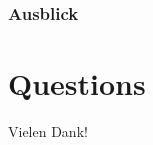 \documentclass[
	10pt,
	t		%
]{beamer}
\begin{document}
\begin{frame}
\frametitle{Ausblick}

\end{frame}

\section{Questions}
\begin{frame}[plain, c]
\begin{center}
\Large Vielen Dank!
\end{center}
\end{frame}
\end{document}
